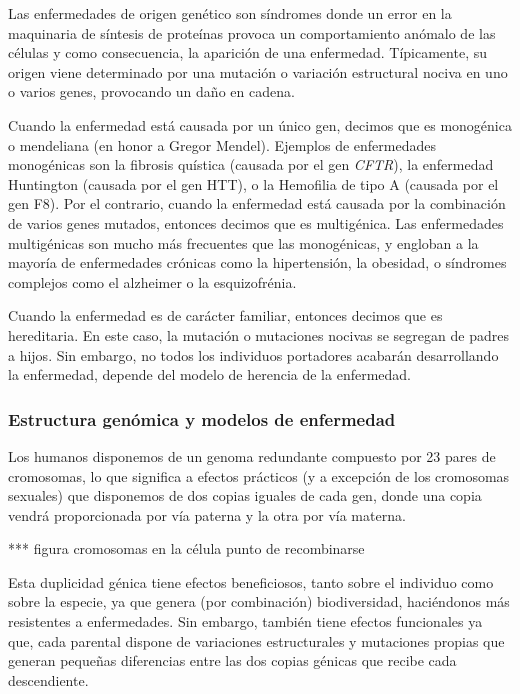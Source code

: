 Las enfermedades de origen genético son síndromes donde un error en la maquinaria de síntesis de proteínas provoca un comportamiento anómalo de las células y como consecuencia, la aparición de una enfermedad. Típicamente, su origen viene determinado por una mutación o variación estructural nociva en uno o varios genes, provocando un daño en cadena.

\medskip

Cuando la enfermedad está causada por un único gen, decimos que es monogénica o mendeliana (en honor a Gregor Mendel). Ejemplos de enfermedades monogénicas son la fibrosis quística (causada por el gen \textit{CFTR})\cite{fq}, la enfermedad Huntington (causada por el gen HTT)\cite{huntington}, o la Hemofilia de tipo A (causada por el gen F8)\cite{hemofilia}. Por el contrario, cuando la enfermedad está causada por la combinación de varios genes mutados, entonces decimos que es multigénica. Las enfermedades multigénicas son mucho más frecuentes que las monogénicas, y engloban a la mayoría de enfermedades crónicas como la hipertensión, la obesidad, o síndromes complejos como el alzheimer o la esquizofrénia. 

\medskip
Cuando la enfermedad es de carácter familiar, entonces decimos que es hereditaria. En este caso, la mutación o mutaciones nocivas se segregan de padres a hijos. Sin embargo, no todos los individuos portadores acabarán desarrollando la enfermedad, depende del modelo de herencia de la enfermedad. 

\subsubsection{Estructura genómica y modelos de enfermedad}

Los humanos disponemos de un genoma redundante compuesto por 23 pares de cromosomas, lo que significa a efectos prácticos (y a excepción de los cromosomas sexuales) que disponemos de dos copias iguales de cada gen, donde una copia vendrá proporcionada por vía paterna y la otra por vía materna. 

\medskip
*** figura cromosomas en la célula punto de recombinarse

\medskip
Esta duplicidad génica tiene efectos beneficiosos, tanto sobre el individuo como sobre la especie, ya que genera (por combinación) biodiversidad, haciéndonos más resistentes a enfermedades. Sin embargo, también tiene efectos funcionales ya que, cada parental dispone de variaciones estructurales y mutaciones propias que generan pequeñas diferencias entre las dos copias génicas que recibe cada descendiente. 

